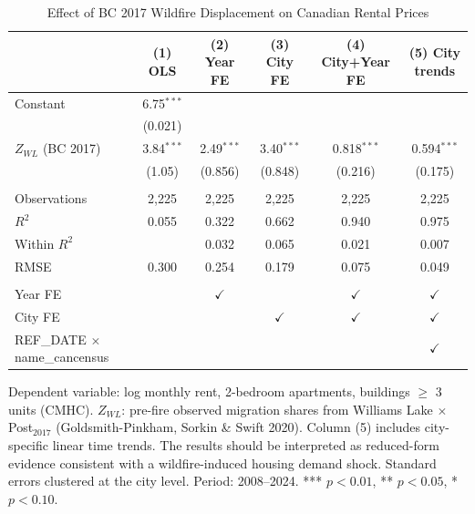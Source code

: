 \begin{table}[htbp]
   \caption{\label{tab:main_result} Effect of BC 2017 Wildfire Displacement on Canadian Rental Prices}
   \bigskip
   \centering
   \begin{tabular}{lccccc}
      \toprule
                                             & (1) OLS & (2) Year FE & (3) City FE & (4) City+Year FE & (5) City trends \\  
      \midrule 
      Constant                               & 6.75$^{***}$ &               &               &               &   \\   
                                             & (0.021)      &               &               &               &   \\   
      $Z_{WL}$ (BC 2017)                     & 3.84$^{***}$ & 2.49$^{***}$  & 3.40$^{***}$  & 0.818$^{***}$ & 0.594$^{***}$\\   
                                             & (1.05)       & (0.856)       & (0.848)       & (0.216)       & (0.175)\\   
       \\
      Observations                           & 2,225        & 2,225         & 2,225         & 2,225         & 2,225\\  
      $R^2$                                  & 0.055        & 0.322         & 0.662         & 0.940         & 0.975\\  
      Within $R^2$                           &              & 0.032         & 0.065         & 0.021         & 0.007\\  
      RMSE                                   & 0.300        & 0.254         & 0.179         & 0.075         & 0.049\\  
       \\
      Year FE                                &              & $\checkmark$  &               & $\checkmark$  & $\checkmark$\\   
      City FE                                &              &               & $\checkmark$  & $\checkmark$  & $\checkmark$\\   
      REF\_DATE $\times $ name\_cancensus    &              &               &               &               & $\checkmark$\\   
      \bottomrule
   \end{tabular}
   
   \par \raggedright 
   Dependent variable: log monthly rent, 2-bedroom apartments, buildings $\geq$ 3 units (CMHC). $Z_{WL}$: pre-fire observed migration shares from Williams Lake $\times$ Post$_{2017}$ (Goldsmith-Pinkham, Sorkin \& Swift 2020). Column (5) includes city-specific linear time trends. The results should be interpreted as reduced-form evidence consistent with a wildfire-induced housing demand shock. Standard errors clustered at the city level. Period: 2008--2024. *** $p<0.01$, ** $p<0.05$, * $p<0.10$.
\end{table}

